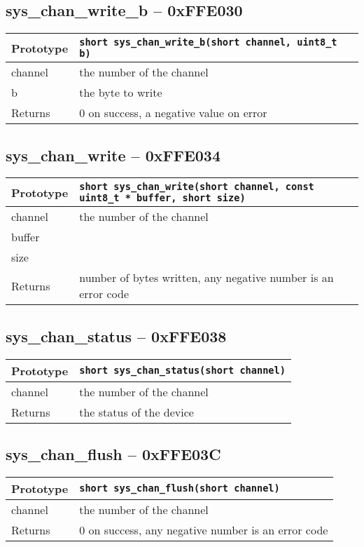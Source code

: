 \subsection*{sys\_chan\_write\_b -- 0xFFE030}
\begin{tabular}{|l||l|} \hline
Prototype & \lstinline!short sys_chan_write_b(short channel, uint8_t b)! \\ \hline
channel & the number of the channel \\ \hline
b & the byte to write \\ \hline
Returns & 0 on success, a negative value on error \\ \hline
\end{tabular}

\subsection*{sys\_chan\_write -- 0xFFE034}
\begin{tabular}{|l||l|} \hline
Prototype & \lstinline!short sys_chan_write(short channel, const uint8_t * buffer, short size)! \\ \hline
channel & the number of the channel \\ \hline
buffer &  \\ \hline
size &  \\ \hline
Returns & number of bytes written, any negative number is an error code \\ \hline
\end{tabular}

\subsection*{sys\_chan\_status -- 0xFFE038}
\begin{tabular}{|l||l|} \hline
Prototype & \lstinline!short sys_chan_status(short channel)! \\ \hline
channel & the number of the channel \\ \hline
Returns & the status of the device \\ \hline
\end{tabular}

\subsection*{sys\_chan\_flush -- 0xFFE03C}
\begin{tabular}{|l||l|} \hline
Prototype & \lstinline!short sys_chan_flush(short channel)! \\ \hline
channel & the number of the channel \\ \hline
Returns & 0 on success, any negative number is an error code \\ \hline
\end{tabular}

